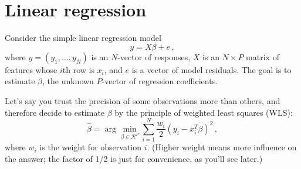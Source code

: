 \documentclass{article}
\begin{document}
\section{Linear regression}

Consider the simple linear regression model
$$
y = X \beta + e \, ,
$$
where $y = (y_1, \ldots, y_N)$ is an $N$-vector of responses, $X$ is an $N \times P$ matrix of features whose $i$th row is $x_i$, and $e$ is a vector of model residuals.  The goal is to estimate $\beta$, the unknown $P$-vector of regression coefficients.  

Let's say you trust the precision of some observations more than others, and therefore decide to estimate $\beta$ by the principle of weighted least squares (WLS):
$$
\hat{\beta} = \arg \min_{\beta \in \mathcal{R}^P} \sum_{i=1}^N \frac{w_i}{2}(y_i - x_i^T \beta)^2 \, ,
$$
where $w_i$ is the weight for observation $i$.  (Higher weight means more influence on the answer; the factor of 1/2 is just for convenience, as you'll see later.)
\end{document}

